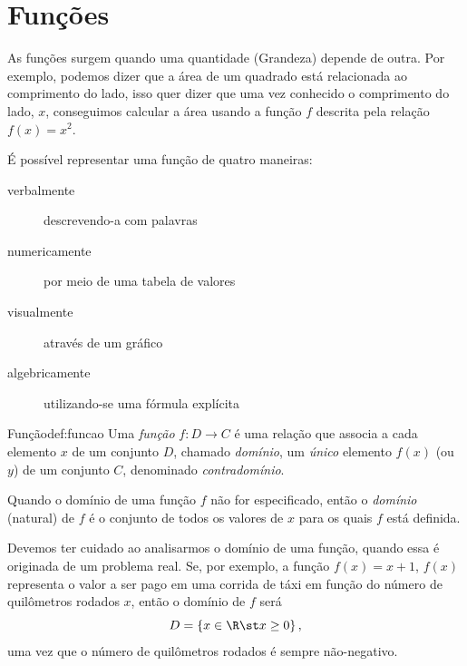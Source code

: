 \section{Funções}

As funções surgem quando uma quantidade (Grandeza) depende de outra. Por
exemplo, podemos dizer que a área de um quadrado está relacionada ao
comprimento do lado, isso quer dizer que uma vez conhecido o comprimento do
lado, $x$, conseguimos calcular a área usando a função $f$ descrita pela
relação $f(x)=x^2$.

É possível representar uma função de quatro maneiras:
\begin{description}
  \item[verbalmente]     descrevendo-a com palavras
  \item[numericamente]   por meio de uma tabela de valores
  \item[visualmente]     através de um gráfico
  \item[algebricamente]  utilizando-se uma fórmula explícita
\end{description}

\begin{definicao}{Função}{def:funcao}
  Uma \emph{função} $f\colon D \to C$
  é uma relação que associa a cada elemento $x$
  de um conjunto $D$, chamado \emph{domínio},
  um \emph{único} elemento
  $f(x)$ (ou $y$) de um conjunto $C$, denominado
  \emph{contradomínio}.
\end{definicao}

\begin{observation}
  Quando o domínio de uma função $f$ não for especificado, então o
  \emph{domínio} (natural)
  de $f$ é o conjunto de todos os valores de $x$
  para os quais $f$ está definida.
\end{observation}

\begin{observation}
  Devemos ter cuidado ao analisarmos o domínio de uma função, quando essa é
  originada de um problema real.
  Se, por exemplo, a função $f(x)=x+1$, $f(x)$
  representa o valor a ser pago em uma corrida de táxi em função do número de
  quilômetros rodados $x$, então o domínio de $f$ será
  \[
    D= \left\{ x \in \R \st x \geq 0 \right\},
  \]
  uma vez que o número de quilômetros rodados é sempre não-negativo.
\end{observation}

